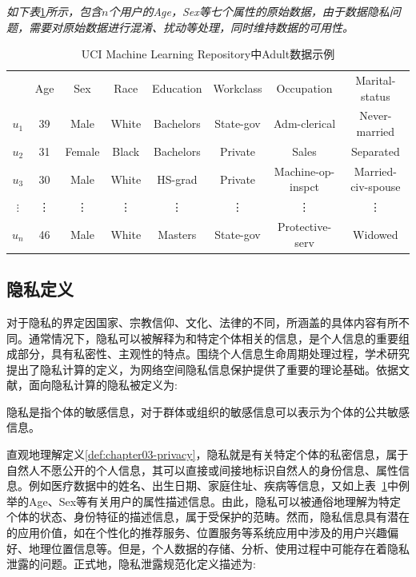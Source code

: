 \begin{example}\label{example:01}{\em 如下表}\ref{tab:origin}{\em 所示，包含$n$个用户的Age，Sex等七个属性的原始数据，由于数据隐私问题，需要对原始数据进行混淆、扰动等处理，同时维持数据的可用性。
	}
	\begin{table}[h!]
		\small
		\centering\caption{UCI Machine Learning Repository中Adult数据示例}
		\begin{tabular}{c|c|c|c|c|c|c|c|}
			\cline{2-8}
			& Age & Sex & Race & Education &Workclass &Occupation &Marital-status \\
			\cline{2-8}
			$u_1$ & 39 & Male & White & Bachelors& State-gov & Adm-clerical & Never-married \\
			$u_2$ & 31 & Female & Black & Bachelors &  Private &  Sales & Separated\\
			$u_{3}$ & 30 & Male& White & HS-grad  & Private  & Machine-op-inspct  & Married-civ-spouse\\
			$\vdots$ & \vdots & \vdots & \vdots & \vdots & \vdots & \vdots & \vdots \\
			$u_n$ & 46 & Male & White & Masters  & State-gov  & Protective-serv  &Widowed\\
			\cline{2-8}
		\end{tabular}\label{tab:origin}
	\end{table}
\end{example}

\subsection{隐私定义}
对于隐私的界定因国家、宗教信仰、文化、法律的不同，所涵盖的具体内容有所不同\cite{Lifenghua16}。通常情况下，隐私可以被解释为和特定个体相关的信息，是个人信息的重要组成部分，具有私密性、主观性的特点。围绕个人信息生命周期处理过程，学术研究提出了隐私计算的定义，为网络空间隐私信息保护提供了重要的理论基础\cite{Lifenghua16}。依据文献，面向隐私计算的隐私被定义为:

\begin{definition}\label{def:chapter03-privacy}隐私是指个体的敏感信息，对于群体或组织的敏感信息可以表示为个体的公共敏感信息。
\end{definition}
直观地理解定义\ref{def:chapter03-privacy}，隐私就是有关特定个体的私密信息，属于自然人不愿公开的个人信息，其可以直接或间接地标识自然人的身份信息、属性信息。例如医疗数据中的姓名、出生日期、家庭住址、疾病等信息，又如上表~\ref{tab:origin}中例举的Age、Sex等有关用户的属性描述信息。由此，隐私可以被通俗地理解为特定个体的状态、身份特征的描述信息，属于受保护的范畴。然而，隐私信息具有潜在的应用价值，如在个性化的推荐服务、位置服务等系统应用中涉及的用户兴趣偏好、地理位置信息等。但是，个人数据的存储、分析、使用过程中可能存在着隐私泄露的问题。正式地，隐私泄露规范化定义描述为:



